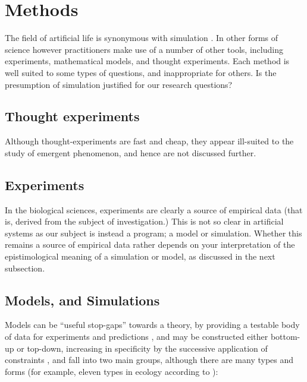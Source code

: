 \section{Methods}\label{methods}

The field of artificial life is synonymous with simulation \autocite[chap.2]{Aicardi2010}. In other forms of science however practitioners make use of a number of other tools, including experiments, mathematical models, and thought experiments. Each method is well suited to some types of questions, and inappropriate for others. Is the presumption of simulation justified for our research questions?

\subsection{Thought experiments}
Although thought-experiments are fast and cheap, they appear ill-suited to the study of emergent phenomenon, and hence are not discussed further.

\subsection{Experiments}\label{experiments}

In the biological sciences, experiments are clearly a source of empirical data (that is, derived from the subject of investigation.) This is not so clear in artificial systems as our subject is instead a program; a model or simulation. Whether this remains a source of empirical data rather depends on your interpretation of the epistimological meaning of a simulation or model, as discussed in the next subsection.

\subsection{Models, and Simulations}\label{models}


Models can be ``useful stop-gaps'' towards a theory, by providing a testable body of data for experiments and predictions \autocite{Krakauer2011}, and may be constructed either bottom-up or top-down, increasing in specificity by the successive application of constraints \autocite{Krakauer2011}, and fall into two main groups, although there are many types and forms (for example, eleven types in ecology according to \autocite{Jorgensen2008}):

